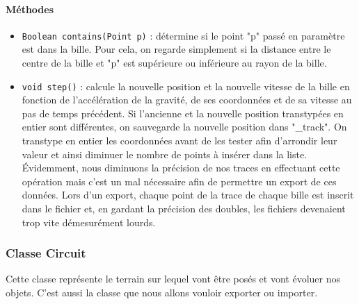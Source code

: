 \documentclass{report}
\begin{document}
\paragraph*{Méthodes}
\begin{itemize}
\item \texttt{Boolean contains(Point p)} : détermine si le point "p" passé en paramètre est dans la bille. Pour cela, on regarde simplement si la distance entre le centre de la bille et "p" est supérieure ou inférieure au rayon de la bille.
\item \texttt{void step()} : calcule la nouvelle position et la nouvelle vitesse de la bille en fonction de l'accélération de la gravité, de ses coordonnées et de sa vitesse au pas de temps précédent. Si l'ancienne et la nouvelle position transtypées en entier sont différentes, on sauvegarde la nouvelle position dans "\_track". On transtype en entier les coordonnées avant de les tester afin d'arrondir leur valeur et ainsi diminuer le nombre de points à insérer dans la liste. Évidemment, nous diminuons la précision de nos traces en effectuant cette opération mais c'est un mal nécessaire afin de permettre un export de ces données. Lors d'un export, chaque point de la trace de chaque bille est inscrit dans le fichier et, en gardant la précision des doubles, les fichiers devenaient trop vite démesurément lourds.
\end{itemize}

\newpage
\subsubsection{Classe Circuit}

Cette classe représente le terrain sur lequel vont être posés et vont évoluer nos objets. C'est aussi la classe que nous allons vouloir exporter ou importer.
\end{document}
